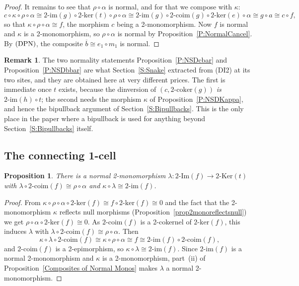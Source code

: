 \documentclass[reqno,a4paper]{amsart}
\numberwithin{equation}{section}
\theoremstyle{plain}
\newtheorem{proposition}[subsection]{Proposition}
\theoremstyle{definition}
\newtheorem{remark}[subsection]{Remark}
\def\nameit#1{\textrm{#1}~}
\def\prox{\nameit{Proposition}}
\newcommand{\comp}{\circ}
\newcommand{\iso}{\cong}
\newcommand{\ov}[1]{\overline{#1}}
\renewcommand{\1}{\onecat{1}}
\newcommand{\DPN}{\textup{(DPN)}}
\newcommand{\TwoKer}{\ensuremath{2\text{-}\mathrm{Ker}}}
\newcommand{\twoker}{\ensuremath{2\text{-}\mathrm{ker}}}
\newcommand{\twocoker}{\ensuremath{2\text{-}\mathrm{coker}}}
\newcommand{\TwoImg}{\ensuremath{2\text{-}\mathrm{Im}}}
\newcommand{\twoimg}{\ensuremath{2\text{-}\mathrm{im}}}
\newcommand{\twocoim}{\ensuremath{2\text{-}\mathrm{coim}}}
\begin{document}
\begin{proof}
	It remains to see that \(\rho\comp\alpha\) is normal, and for that we compose with \(\kappa\):
	\[
		c\comp\kappa\comp\rho\comp\alpha\iso\twoimg(g)\comp\twoker(t)\comp\rho\comp\alpha\iso\twoimg(g)\comp\twocoim(g)\comp\twoker(e)\comp\alpha\iso g\comp a\iso c\comp f\text{,}
	\]
	so that \(\kappa\comp\rho\comp\alpha\iso f\), the morphism \(c\) being a 2-monomorphism. Now \(f\) is normal and \(\kappa\) is a 2-monomorphism, so \(\rho\comp\alpha\) is normal by \prox\ref{P:NormalCancel}. By \(\DPN\), the composite \(\ov{b}\iso e_1\comp m_1\) is normal.
\end{proof}

\begin{remark}\label{Rem NSD Sites}
	The two normality statements \prox\ref{P:NSDcbar} and \prox\ref{P:NSDbbar} are what Section~\ref{S:Snake} extracted from \textup{(DI2)} at its two sites, and they are obtained here at very different prices. The first is immediate once \(t\) exists, because the dinversion of \((c,\twocoker(g))\) \emph{is} \(\twoimg(h)\comp t\); the second needs the morphism \(\kappa\) of \prox\ref{P:NSDKappa}, and hence the bipullback argument of Section~\ref{S:Bipullbacks}. This is the only place in the paper where a bipullback is used for anything beyond Section~\ref{S:Bipullbacks} itself.
\end{remark}

\subsection{The connecting 1-cell}\label{SS:NSDConnecting}

\begin{proposition}\label{P:NSDLambda}
	There is a normal 2-monomorphism \(\lambda\colon\TwoImg(f)\to\TwoKer(t)\) with \(\lambda\comp\twocoim(f)\iso\rho\comp\alpha\) and \(\kappa\comp\lambda\iso\twoimg(f)\).
\end{proposition}
\begin{proof}
	From \(\kappa\comp\rho\comp\alpha\comp\twoker(f)\iso f\comp\twoker(f)\iso 0\) and the fact that the 2-monomorphism \(\kappa\) reflects null morphisms (\prox\ref{prop2monoreflectsnull}) we get \(\rho\comp\alpha\comp\twoker(f)\iso 0\). As \(\twocoim(f)\) is a 2-cokernel of \(\twoker(f)\), this induces \(\lambda\) with \(\lambda\comp\twocoim(f)\iso\rho\comp\alpha\). Then
	\[
		\kappa\comp\lambda\comp\twocoim(f)\iso\kappa\comp\rho\comp\alpha\iso f\iso\twoimg(f)\comp\twocoim(f)\text{,}
	\]
	and \(\twocoim(f)\) is a 2-epimorphism, so \(\kappa\comp\lambda\iso\twoimg(f)\). Since \(\twoimg(f)\) is a normal 2-monomorphism and \(\kappa\) is a 2-monomorphism, part~\textup{(ii)} of \prox\ref{Composites of Normal Monos} makes \(\lambda\) a normal 2-monomorphism.
\end{proof}
\end{document}

